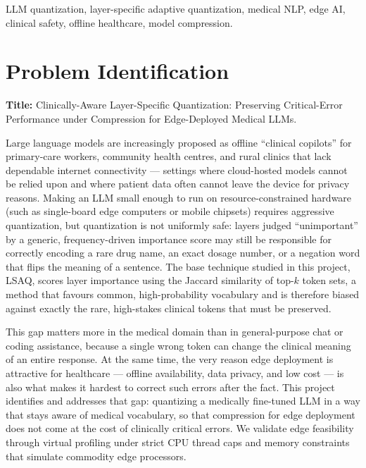 \documentclass[conference]{IEEEtran}
\begin{document}
\begin{IEEEkeywords}
LLM quantization, layer-specific adaptive quantization, medical NLP, edge AI, clinical safety, offline healthcare, model compression.
\end{IEEEkeywords}

\section{Problem Identification}
\textbf{Title:} Clinically-Aware Layer-Specific Quantization: Preserving Critical-Error Performance under Compression for Edge-Deployed Medical LLMs.

Large language models are increasingly proposed as offline ``clinical copilots'' for primary-care workers, community health centres, and rural clinics that lack dependable internet connectivity --- settings where cloud-hosted models cannot be relied upon and where patient data often cannot leave the device for privacy reasons. Making an LLM small enough to run on resource-constrained hardware (such as single-board edge computers or mobile chipsets) requires aggressive quantization, but quantization is not uniformly safe: layers judged ``unimportant'' by a generic, frequency-driven importance score may still be responsible for correctly encoding a rare drug name, an exact dosage number, or a negation word that flips the meaning of a sentence. The base technique studied in this project, LSAQ, scores layer importance using the Jaccard similarity of top-$k$ token sets, a method that favours common, high-probability vocabulary and is therefore biased against exactly the rare, high-stakes clinical tokens that must be preserved.

This gap matters more in the medical domain than in general-purpose chat or coding assistance, because a single wrong token can change the clinical meaning of an entire response. At the same time, the very reason edge deployment is attractive for healthcare --- offline availability, data privacy, and low cost --- is also what makes it hardest to correct such errors after the fact. This project identifies and addresses that gap: quantizing a medically fine-tuned LLM in a way that stays aware of medical vocabulary, so that compression for edge deployment does not come at the cost of clinically critical errors. We validate edge feasibility through virtual profiling under strict CPU thread caps and memory constraints that simulate commodity edge processors.
\end{document}
